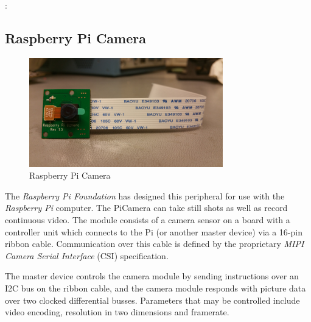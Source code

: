 :\subsection{Raspberry Pi Camera}
\begin{figure}[h]
    \centering
    \includegraphics[width=0.75\textwidth]{img/picamera}
    \caption{Raspberry Pi Camera}
\end{figure}

The \textit{Raspberry Pi Foundation} has designed this peripheral for use with the \textit{Raspberry Pi} computer.
The PiCamera can take still shots as well as record continuous video.
The module consists of a camera sensor on a board with a controller unit which connects to the Pi (or another master device) via a 16-pin ribbon cable.
Communication over this cable is defined by the proprietary \textit{MIPI Camera Serial Interface} (CSI) specification.

The master device controls the camera module by sending instructions over an I2C bus on the ribbon cable,
and the camera module responds with picture data over two clocked differential busses.
Parameters that may be controlled include video encoding, resolution in two dimensions and framerate.


